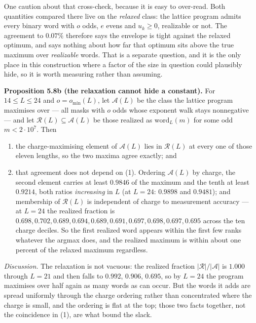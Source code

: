 \documentclass[12pt]{article}
\providecommand{\tightlist}{\setlength{\itemsep}{0pt}\setlength{\parskip}{0pt}}
\begin{document}
One caution about that cross-check, because it is easy to over-read.
Both quantities compared there live on the \emph{relaxed} class: the
lattice program admits every binary word with \(o\) odds, \(e\) evens
and \(u_k\ge0\), realizable or not. The agreement to \(0.07\%\)
therefore says the envelope is tight against the relaxed optimum, and
says nothing about how far that optimum sits above the true maximum over
\emph{realizable} words. That is a separate question, and it is the only
place in this construction where a factor of the size in question could
plausibly hide, so it is worth measuring rather than assuming.

\textbf{Proposition 5.8b (the relaxation cannot hide a constant).} For
\(14\le L\le24\) and \(o=o_{\min}(L)\), let \(\mathcal A(L)\) be the
class the lattice program maximises over --- all masks with \(o\) odds
whose exponent walk stays nonnegative --- and let
\(\mathcal R(L)\subseteq\mathcal A(L)\) be those realized as
\(\mathrm{word}_L(m)\) for some odd \(m<2\cdot10^{7}\). Then

\begin{enumerate}
\def\labelenumi{\arabic{enumi}.}
\tightlist
\item
  the charge-maximising element of \(\mathcal A(L)\) lies in
  \(\mathcal R(L)\) at every one of those eleven lengths, so the two
  maxima agree exactly; and
\item
  that agreement does not depend on (1). Ordering \(\mathcal A(L)\) by
  charge, the second element carries at least \(0.9846\) of the maximum
  and the tenth at least \(0.9214\), both ratios \emph{increasing} in
  \(L\) (at \(L=24\): \(0.9898\) and \(0.9481\)); and membership of
  \(\mathcal R(L)\) is independent of charge to measurement accuracy ---
  at \(L=24\) the realized fraction is \(0.698,0.702,0.689,0.694,
  0.689,0.691,0.697,0.698,0.697,0.695\) across the ten charge deciles.
  So the first realized word appears within the first few ranks whatever
  the argmax does, and the realized maximum is within about one percent
  of the relaxed maximum regardless.
\end{enumerate}

\emph{Discussion.} The relaxation is not vacuous: the realized fraction
\(\lvert\mathcal R\rvert/\lvert\mathcal A\rvert\) is \(1.000\) through
\(L=21\) and then falls to \(0.992\), \(0.906\), \(0.695\), so by
\(L=24\) the program maximises over half again as many words as can
occur. But the words it adds are spread uniformly through the charge
ordering rather than concentrated where the charge is small, and the
ordering is flat at the top; those two facts together, not the
coincidence in (1), are what bound the slack.
\end{document}
